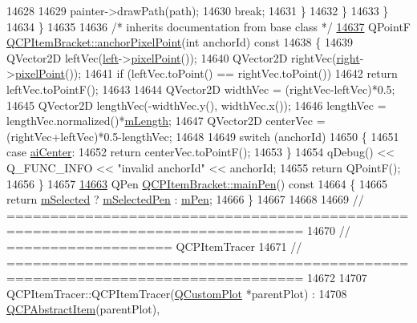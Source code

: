 \begin{DoxyCode}
14628         
14629         painter->drawPath(path);
14630         \textcolor{keywordflow}{break};
14631       \}
14632     \}
14633   \}
14634 \}
14635 
14636 \textcolor{comment}{/* inherits documentation from base class */}
\hypertarget{a00115_source_l14637}{}\hyperlink{a00033_ac76827e3acba5faee81f149af4047a39}{14637} QPointF \hyperlink{a00033_ac76827e3acba5faee81f149af4047a39}{QCPItemBracket::anchorPixelPoint}(\textcolor{keywordtype}{int} anchorId)\textcolor{keyword}{ const}
14638 \textcolor{keyword}{}\{
14639   QVector2D leftVec(\hyperlink{a00033_af6cc6d27d96171778c6927d6edce48b0}{left}->\hyperlink{a00038_ae490f9c76ee2ba33752c495d3b6e8fb5}{pixelPoint}());
14640   QVector2D rightVec(\hyperlink{a00033_afa6c1360b05a50c4e0df37b3cebab6be}{right}->\hyperlink{a00038_ae490f9c76ee2ba33752c495d3b6e8fb5}{pixelPoint}());
14641   \textcolor{keywordflow}{if} (leftVec.toPoint() == rightVec.toPoint())
14642     \textcolor{keywordflow}{return} leftVec.toPointF();
14643   
14644   QVector2D widthVec = (rightVec-leftVec)*0.5;
14645   QVector2D lengthVec(-widthVec.y(), widthVec.x());
14646   lengthVec = lengthVec.normalized()*\hyperlink{a00033_ab3d99bba8da18eb4d0e0cb23dded33b2}{mLength};
14647   QVector2D centerVec = (rightVec+leftVec)*0.5-lengthVec;
14648   
14649   \textcolor{keywordflow}{switch} (anchorId)
14650   \{
14651     \textcolor{keywordflow}{case} \hyperlink{a00033_a7f3a6a56d67f71219ed220553f3dd861a17b57ef34cc05eadfe9becd1ad5b5242}{aiCenter}:
14652       \textcolor{keywordflow}{return} centerVec.toPointF();
14653   \}
14654   qDebug() << Q\_FUNC\_INFO << \textcolor{stringliteral}{"invalid anchorId"} << anchorId;
14655   \textcolor{keywordflow}{return} QPointF();
14656 \}
14657 
\hypertarget{a00115_source_l14663}{}\hyperlink{a00033_a8df4ad873bf88a4a7bfb9bbbd490e495}{14663} QPen \hyperlink{a00033_a8df4ad873bf88a4a7bfb9bbbd490e495}{QCPItemBracket::mainPen}()\textcolor{keyword}{ const}
14664 \textcolor{keyword}{}\{
14665     \textcolor{keywordflow}{return} \hyperlink{a00022_a4bdb3457dad1d268c0f78a44152b9645}{mSelected} ? \hyperlink{a00033_adcfb53602d1802d00e2de4fd6df6b291}{mSelectedPen} : \hyperlink{a00033_a350c864a5853b04343719f5a8be6b675}{mPen};
14666 \}
14667 
14668 
14669 \textcolor{comment}{// ================================================================================}
14670 \textcolor{comment}{// =================== QCPItemTracer}
14671 \textcolor{comment}{// ================================================================================}
14672 
14707 QCPItemTracer::QCPItemTracer(\hyperlink{a00030_d8/d00/a00186}{QCustomPlot} *parentPlot) :
14708   \hyperlink{a00022}{QCPAbstractItem}(parentPlot),

\end{DoxyCode}
